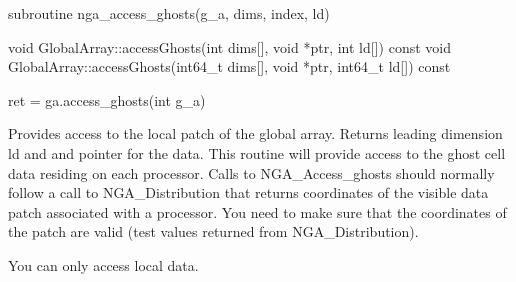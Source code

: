 \documentclass[12pt]{article}
\begin{document}
\begin{fapi}
\begin{fcode}
subroutine nga_access_ghosts(g_a, dims, index, ld)
\end{fcode}
\begin{funcargs}
\end{funcargs}
\end{fapi}

\begin{cxxapi}
\begin{cxxcode}
void GlobalArray::accessGhosts(int dims[], void *ptr, int ld[]) const
void GlobalArray::accessGhosts(int64_t dims[], void *ptr, int64_t ld[]) const
\end{cxxcode}
\begin{funcargs}
\end{funcargs}
\end{cxxapi}

\begin{pyapi}
\begin{pycode}
ret = ga.access_ghosts(int g_a)
\end{pycode}
\begin{funcargs}
\end{funcargs}
\end{pyapi}

\local

\begin{desc}

Provides access to the local patch of the global array. Returns leading
dimension ld and and pointer for the data.  This routine will provide access to
the ghost cell data residing on each processor. Calls to NGA_Access_ghosts
should normally follow a call to NGA_Distribution that returns coordinates of
the visible data patch associated with a processor. You need to make sure that
the coordinates of the patch are valid (test values returned from
NGA_Distribution).

You can only access local data.

\end{desc}
\end{document}

